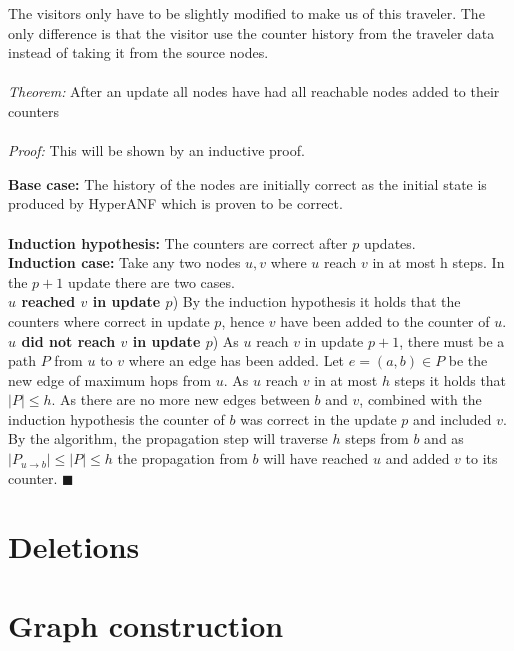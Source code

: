 The visitors only have to be slightly modified to make us of this traveler. The only difference is that the visitor use the counter history from the traveler data instead of taking it from the source nodes.\\\\
\textit{Theorem: } After an update all nodes have had all reachable nodes added to their counters \\\\
\textit{Proof: } This will be shown by an inductive proof. 

\begin{addmargin}[2em]{0em}
\textbf{Base case: } The history of the nodes are initially correct as the initial state is produced by HyperANF which is proven to be correct. \\\\
\textbf{Induction hypothesis: } The counters are correct after $p$ updates.\\
\textbf{Induction case: } Take any two nodes $u,v$ where $u$ reach $v$ in at most h steps. In the $p+1$ update there are two cases. \\

\textbf{$u$ reached $v$ in update $p$}) By the induction hypothesis it holds that the counters where correct in update $p$, hence $v$ have been added to the counter of $u$.\\

\textbf{$u$ did not reach $v$ in update $p$}) As $u$ reach $v$ in update $p+1$, there must be a path $P$ from $u$ to $v$ where an edge has been added. Let $e = (a,b) \in P$ be the new edge of maximum hops from $u$. As $u$ reach $v$ in at most $h$ steps it holds that $|P| \leq h$.
 As there are no more new edges between $b$ and $v$, combined with the induction hypothesis the counter of $b$ was correct in the update $p$ and included $v$. By the algorithm, the propagation step will traverse $h$ steps from $b$ and as 
$|P_{u \rightarrow b}| \leq |P| \leq h$ the propagation from $b$ will have reached $u$ and added $v$ to its counter. $\blacksquare$


\end{addmargin}

\section{Deletions}

\section{Graph construction}

